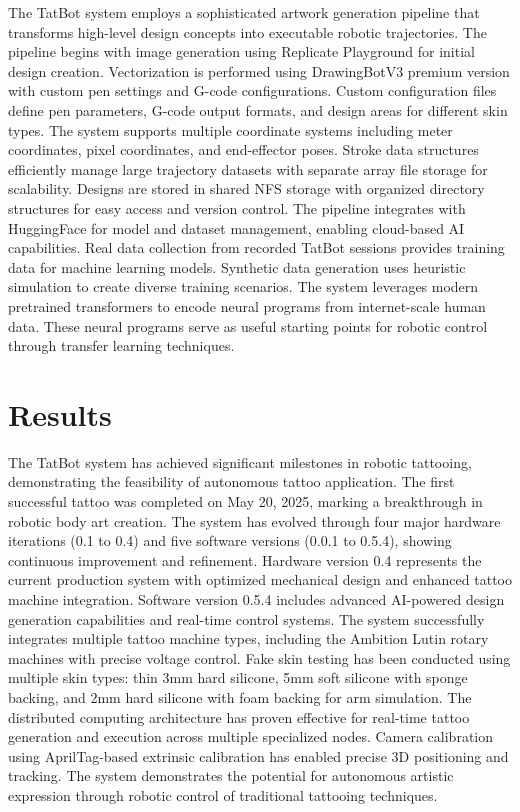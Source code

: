 \documentclass[11pt]{article}
\begin{document}
The TatBot system employs a sophisticated artwork generation pipeline that transforms high-level design concepts into executable robotic trajectories.
The pipeline begins with image generation using Replicate Playground for initial design creation.
Vectorization is performed using DrawingBotV3 premium version with custom pen settings and G-code configurations.
Custom configuration files define pen parameters, G-code output formats, and design areas for different skin types.
The system supports multiple coordinate systems including meter coordinates, pixel coordinates, and end-effector poses.
Stroke data structures efficiently manage large trajectory datasets with separate array file storage for scalability.
Designs are stored in shared NFS storage with organized directory structures for easy access and version control.
The pipeline integrates with HuggingFace for model and dataset management, enabling cloud-based AI capabilities.
Real data collection from recorded TatBot sessions provides training data for machine learning models.
Synthetic data generation uses heuristic simulation to create diverse training scenarios.
The system leverages modern pretrained transformers to encode neural programs from internet-scale human data.
These neural programs serve as useful starting points for robotic control through transfer learning techniques.

\section{Results}

The TatBot system has achieved significant milestones in robotic tattooing, demonstrating the feasibility of autonomous tattoo application.
The first successful tattoo was completed on May 20, 2025, marking a breakthrough in robotic body art creation.
The system has evolved through four major hardware iterations (0.1 to 0.4) and five software versions (0.0.1 to 0.5.4), showing continuous improvement and refinement.
Hardware version 0.4 represents the current production system with optimized mechanical design and enhanced tattoo machine integration.
Software version 0.5.4 includes advanced AI-powered design generation capabilities and real-time control systems.
The system successfully integrates multiple tattoo machine types, including the Ambition Lutin rotary machines with precise voltage control.
Fake skin testing has been conducted using multiple skin types: thin 3mm hard silicone, 5mm soft silicone with sponge backing, and 2mm hard silicone with foam backing for arm simulation.
The distributed computing architecture has proven effective for real-time tattoo generation and execution across multiple specialized nodes.
Camera calibration using AprilTag-based extrinsic calibration has enabled precise 3D positioning and tracking.
The system demonstrates the potential for autonomous artistic expression through robotic control of traditional tattooing techniques.
\end{document}
